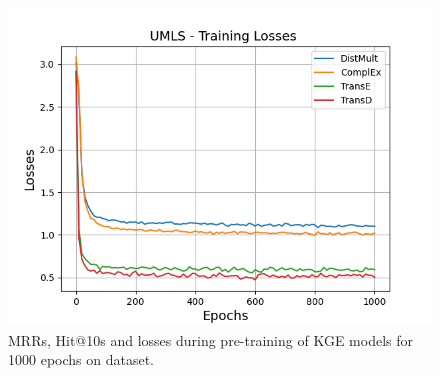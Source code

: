 \begin{figure}[H]
    \begin{minipage}{.3\textwidth}
      \centering
      \includegraphics[width=\linewidth]{figures/results/pretrain/umls/pretrain_umls_losses.png}
    \end{minipage}%
    \caption{MRRs, Hit@10s and losses during pre-training of \ac{KGE} models for 1000 epochs on \umls dataset.}
    \label{fig:pretraining}
\end{figure}
